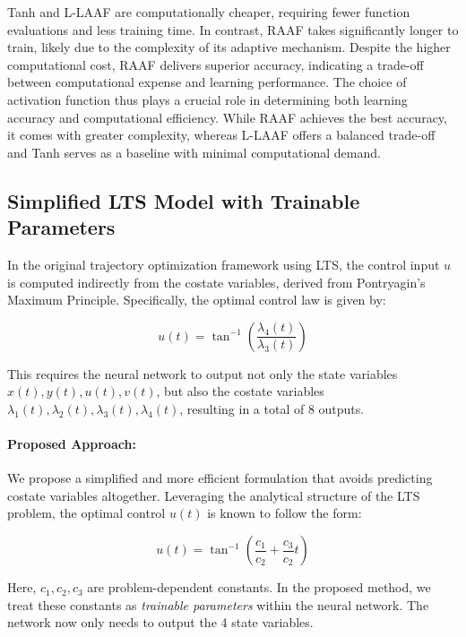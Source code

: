 Tanh and L-LAAF are computationally cheaper, requiring fewer function evaluations and less training time. In contrast, RAAF takes significantly longer to train, likely due to the complexity of its adaptive mechanism. Despite the higher computational cost, RAAF delivers superior accuracy, indicating a trade-off between computational expense and learning performance. The choice of activation function thus plays a crucial role in determining both learning accuracy and computational efficiency. While RAAF achieves the best accuracy, it comes with greater complexity, whereas L-LAAF offers a balanced trade-off and Tanh serves as a baseline with minimal computational demand.



\subsection{Simplified LTS Model with Trainable Parameters}

In the original trajectory optimization framework using LTS, the control input \( u\) is computed indirectly from the costate variables, derived from Pontryagin's Maximum Principle. Specifically, the optimal control law is given by:

\begin{equation}
u(t) = \tan^{-1}\left(\frac{\lambda_4(t)}{\lambda_3(t)}\right)
\end{equation}

This requires the neural network to output not only the state variables \( x(t), y(t), u(t), v(t) \), but also the costate variables \( \lambda_1(t), \lambda_2(t), \lambda_3(t), \lambda_4(t) \), resulting in a total of 8 outputs.

\paragraph{Proposed Approach:}
We propose a simplified and more efficient formulation that avoids predicting costate variables altogether. Leveraging the analytical structure of the LTS problem, the optimal control \( u(t) \) is known to follow the form:

\begin{equation}
u(t) = \tan^{-1} \left( \frac{c_1}{c_2} + \frac{c_3}{c_2} t \right)
\label{eq:simplified_control}
\end{equation}

Here, \( c_1, c_2, c_3 \) are problem-dependent constants. In the proposed method, we treat these constants as \textit{trainable parameters} within the neural network. The network now only needs to output the 4 state variables.

